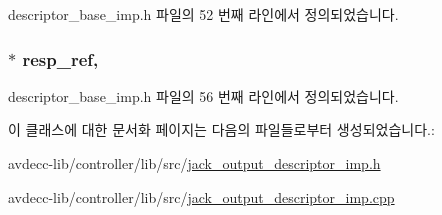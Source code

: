 descriptor\+\_\+base\+\_\+imp.\+h 파일의 52 번째 라인에서 정의되었습니다.

\subsubsection[{\texorpdfstring{resp\+\_\+ref}{resp_ref}}]{$\ast$ resp\+\_\+ref\hspace{0.3cm}{\ttfamily [protected]}, {\ttfamily [inherited]}}\hypertarget{classavdecc__lib_1_1descriptor__base__imp_a2642e3a7c10d38553e7ff4a55e875346}{}\label{classavdecc__lib_1_1descriptor__base__imp_a2642e3a7c10d38553e7ff4a55e875346}


descriptor\+\_\+base\+\_\+imp.\+h 파일의 56 번째 라인에서 정의되었습니다.



이 클래스에 대한 문서화 페이지는 다음의 파일들로부터 생성되었습니다.\+:\begin{DoxyCompactItemize}
\item 
avdecc-\/lib/controller/lib/src/\hyperlink{jack__output__descriptor__imp_8h}{jack\+\_\+output\+\_\+descriptor\+\_\+imp.\+h}\item 
avdecc-\/lib/controller/lib/src/\hyperlink{jack__output__descriptor__imp_8cpp}{jack\+\_\+output\+\_\+descriptor\+\_\+imp.\+cpp}\end{DoxyCompactItemize}
